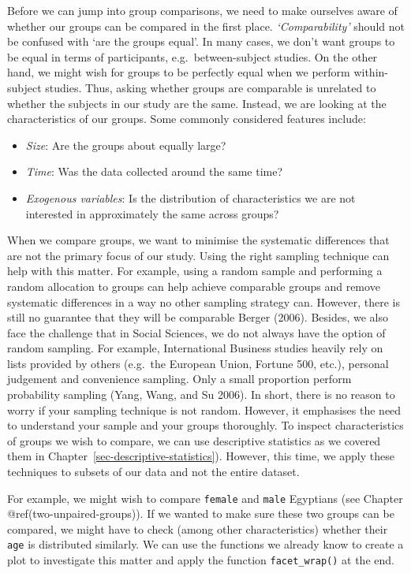 \documentclass[
  letterpaper,
]{krantz}
\begin{document}
Before we can jump into group comparisons, we need to make ourselves
aware of whether our groups can be compared in the first place.
\emph{`Comparability'} should not be confused with `are the groups
equal'. In many cases, we don't want groups to be equal in terms of
participants, e.g.~between-subject studies. On the other hand, we might
wish for groups to be perfectly equal when we perform within-subject
studies. Thus, asking whether groups are comparable is unrelated to
whether the subjects in our study are the same. Instead, we are looking
at the characteristics of our groups. Some commonly considered features
include:

\begin{itemize}
\item
  \emph{Size}: Are the groups about equally large?
\item
  \emph{Time}: Was the data collected around the same time?
\item
  \emph{Exogenous variables}: Is the distribution of characteristics we
  are not interested in approximately the same across groups?
\end{itemize}

When we compare groups, we want to minimise the systematic differences
that are not the primary focus of our study. Using the right sampling
technique can help with this matter. For example, using a random sample
and performing a random allocation to groups can help achieve comparable
groups and remove systematic differences in a way no other sampling
strategy can. However, there is still no guarantee that they will be
comparable Berger (2006). Besides, we also face the challenge that in
Social Sciences, we do not always have the option of random sampling.
For example, International Business studies heavily rely on lists
provided by others (e.g.~the European Union, Fortune 500, etc.),
personal judgement and convenience sampling. Only a small proportion
perform probability sampling (Yang, Wang, and Su 2006). In short, there
is no reason to worry if your sampling technique is not random. However,
it emphasises the need to understand your sample and your groups
thoroughly. To inspect characteristics of groups we wish to compare, we
can use descriptive statistics as we covered them in
Chapter~\ref{sec-descriptive-statistics}). However, this time, we apply
these techniques to subsets of our data and not the entire dataset.

For example, we might wish to compare \texttt{female} and \texttt{male}
Egyptians (see Chapter @ref(two-unpaired-groups)). If we wanted to make
sure these two groups can be compared, we might have to check (among
other characteristics) whether their \texttt{age} is distributed
similarly. We can use the functions we already know to create a plot to
investigate this matter and apply the function \texttt{facet\_wrap()} at
the end.
\end{document}
